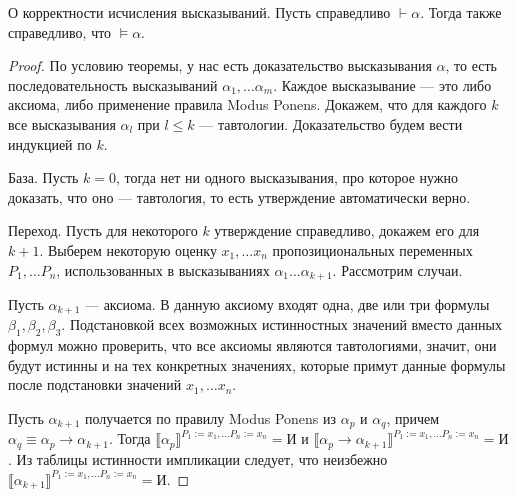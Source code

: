 %
%

\begin{theorem}{О корректности исчисления высказываний.}
Пусть справедливо $\vdash \alpha$. Тогда также справедливо, что $\models \alpha$.
\end{theorem}

\begin{proof}
По условию теоремы, у нас есть доказательство высказывания $\alpha$, то есть 
последовательность высказываний $\alpha_1, \dots \alpha_m$.
Каждое высказывание --- это либо аксиома, либо применение правила Modus Ponens.
Докажем, что для каждого $k$ все высказывания $\alpha_l$ при $l \le k$ --- тавтологии.
Доказательство будем вести индукцией по $k$.

База. Пусть $k=0$, тогда нет ни одного высказывания, про которое нужно доказать, что
оно --- тавтология, то есть утверждение автоматически верно.

Переход. Пусть для некоторого $k$ утверждение справедливо, докажем его для $k+1$.
Выберем некоторую оценку $x_1, \dots x_n$ пропозициональных 
переменных $P_1, \dots P_n$, использованных в высказываниях $\alpha_1 \dots \alpha_{k+1}$.
Рассмотрим случаи. 

Пусть $\alpha_{k+1}$ --- аксиома. В данную аксиому входят одна, две или три формулы
$\beta_1, \beta_2, \beta_3$. Подстановкой всех возможных истинностных значений
вместо данных формул можно проверить, что все аксиомы являются тавтологиями,
значит, они будут истинны и на тех конкретных значениях, которые примут данные формулы
после подстановки значений $x_1, \dots x_n$.

Пусть $\alpha_{k+1}$ получается по правилу Modus Ponens из $\alpha_p$ и 
$\alpha_q$, причем $\alpha_q \equiv \alpha_p \rightarrow \alpha_{k+1}$.
Тогда $\llbracket\alpha_p\rrbracket^{P_1 := x_1, \dots P_n:=x_n} = \texttt{И}$ и 
$\llbracket\alpha_p \rightarrow \alpha_{k+1}\rrbracket^{P_1:=x_1, \dots P_n:=x_n} = \texttt{И}$.
Из таблицы истинности импликации следует, что неизбежно 
$\llbracket\alpha_{k+1}\rrbracket^{P_1:=x_1, \dots P_n:=x_n} = \texttt{И}$.

\end{proof}

